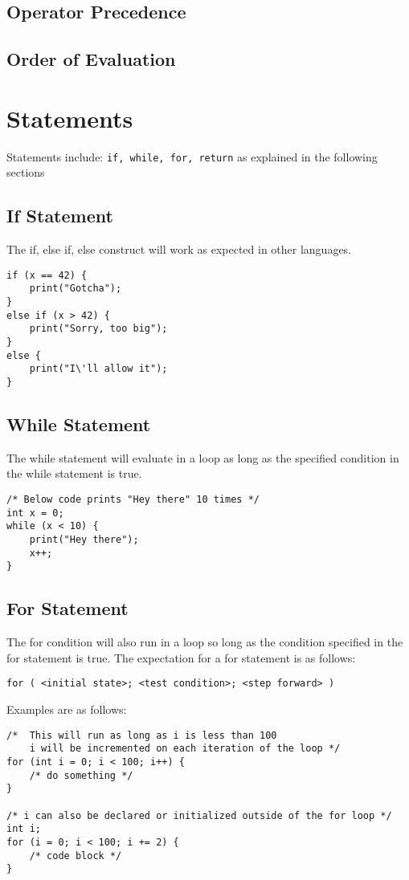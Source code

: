 \documentclass{article}
\begin{document}
\subsection{Operator Precedence}

\subsection{Order of Evaluation}

\section{Statements}
Statements include: \texttt{if, while, for, return} as explained in the following sections

\subsection{If Statement}
The if, else if, else construct will work as expected in other languages.

\begin{lstlisting}
if (x == 42) {
	print("Gotcha");
}
else if (x > 42) {
	print("Sorry, too big");
}
else {
	print("I\'ll allow it");
}
\end{lstlisting}

\subsection{While Statement}
The while statement will evaluate in a loop as long as the specified condition in the while statement is true.

\begin{lstlisting}
/* Below code prints "Hey there" 10 times */
int x = 0;
while (x < 10) {
	print("Hey there");
	x++;
}
\end{lstlisting}

\subsection{For Statement}
The for condition will also run in a loop so long as the condition specified in the for statement is true.  The expectation for a for statement is as follows:

\texttt{for ( <initial state>; <test condition>; <step forward> )}

Examples are as follows:

\begin{lstlisting}
/* 	This will run as long as i is less than 100
	i will be incremented on each iteration of the loop */
for (int i = 0; i < 100; i++) {
	/* do something */
}

/* i can also be declared or initialized outside of the for loop */
int i;
for (i = 0; i < 100; i += 2) {
	/* code block */
}
\end{lstlisting}
\end{document}
